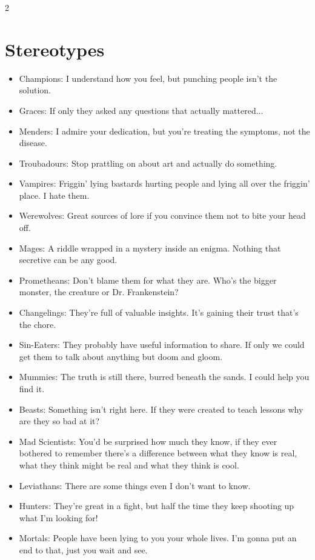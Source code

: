 \begin{multicols}{2}
\section*{Stereotypes}
\begin{itemize}

\item Champions: I understand how you feel, but punching people isn't the solution.
\item Graces: If only they asked any questions that actually mattered...
\item Menders: I admire your dedication, but you're treating the symptoms, not the disease.
\item Troubadours: Stop prattling on about art and actually do something.

\item Vampires: Friggin' lying bastards hurting people and lying all over the friggin' place. I hate them.
\item Werewolves: Great sources of lore if you convince them not to bite your head off.
\item Mages: A riddle wrapped in a mystery inside an enigma. Nothing that secretive can be any good. 
\item Prometheans: Don't blame them for what they are. Who's the bigger monster, the creature or Dr. Frankenstein?
\item Changelings: They're full of valuable insights. It's gaining their trust that's the chore.
\item Sin-Eaters: They probably have useful information to share. If only we could get them to talk about anything but doom and gloom.
\item Mummies: The truth is still there, burred beneath the sands. I could help you find it.
\item Beasts: Something isn't right here. If they were created to teach lessons why are they so bad at it?

\item Mad Scientists: You'd be surprised how much they know, if they ever bothered to remember there's a difference between what they know is real, what they think might be real and what they think is cool.
\item Leviathans: There are some things even I don't want to know.

\item Hunters: They're great in a fight, but half the time they keep shooting up what I'm looking for!
\item Mortals: People have been lying to you your whole lives. I'm gonna put an end to that, just you wait and see. 


\end{itemize}
\end{multicols}

